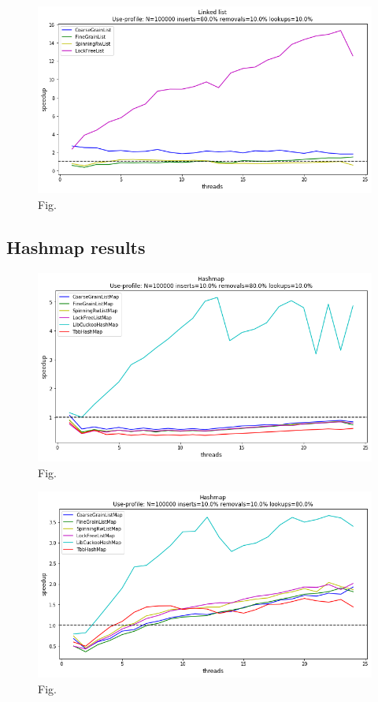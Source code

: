 \documentclass[11pt]{article}
\begin{document}
\begin{figure}[h]
\centering
\includegraphics[width=1.0\linewidth]{figs/lateday/combined/lateday_combined_list_insert_80_lookup_10_removal_10}
\caption{Fig.}
\label{fig:fig1}
\end{figure}

\subsection{Hashmap results}

\begin{figure}[h]
\centering
\includegraphics[width=0.5\linewidth]{figs/lateday/combined/lateday_combined_map_insert_10_lookup_10_removal_80}
\caption{Fig.}
\label{fig:fig2}
\end{figure}

\begin{figure}[h]
\centering
\includegraphics[width=0.5\linewidth]{figs/lateday/combined/lateday_combined_map_insert_10_lookup_80_removal_10}
\caption{Fig.}
\label{fig:fig2}
\end{figure}
\end{document}
